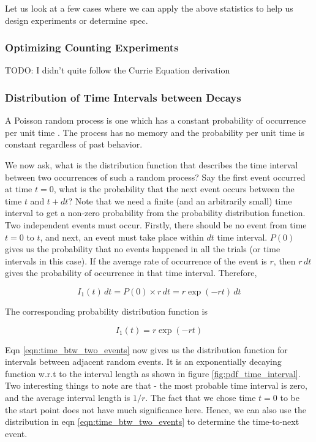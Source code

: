 \documentclass{article}
\begin{document}
Let us look at a few cases where we can apply the above statistics to help us design experiments or determine spec.


\subsubsection{Optimizing Counting Experiments}

TODO: I didn't quite follow the Currie Equation derivation

\subsubsection{Distribution of Time Intervals between Decays}

A Poisson random process is one which has a constant probability of occurrence per unit time \cite{Knoll2000}. The process has no memory and the probability per unit time is constant regardless of past behavior.


We now ask, what is the distribution function that describes the time interval between two occurrences of such a random process? Say the first event occurred at time $t=0$, what is the probability that the next event occurs 
between the time $t$ and $t+dt$? Note that we need a finite (and an arbitrarily small) time interval to get a non-zero probability from the probability distribution function.
Two independent events must occur. Firstly, there should be no event from time $t=0$ to $t$, and next, an event must take place within $dt$ time interval. 
$P(0)$ gives us the probability that no events happened in all the trials (or time intervals in this case). If the average rate of occurrence of the event is $r$, then $r\, dt$ gives the probability 
of occurrence in that time interval. Therefore,

\[I_1(t) \, dt = P(0) \times r \, dt = r \exp (-rt) \, dt\]

The corresponding probability distribution function is

\begin{equation}\label{eqn:time_btw_two_events}
    I_1(t)= r \exp (-rt) 
\end{equation}

Eqn \ref{eqn:time_btw_two_events} now gives us the distribution function for intervals between adjacent random events. It is an exponentially decaying function w.r.t to the interval length as shown in figure \ref{fig:pdf_time_interval}.
Two interesting things to note are that - the most probable time interval is zero, and the average interval length is $1/r$. 
The fact that we chose time $t=0$ to be the start point does not have much significance here. Hence, we can also use the distribution in eqn \ref{eqn:time_btw_two_events} to determine 
the time-to-next event. 
\end{document}
